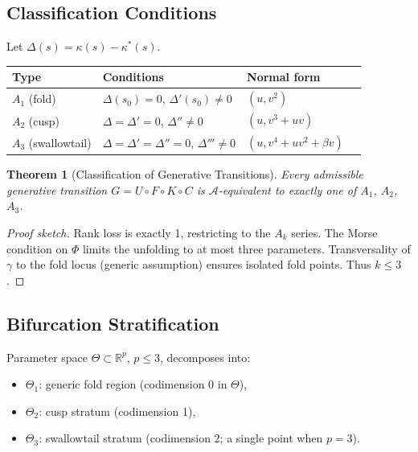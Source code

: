 \documentclass[12pt,a4paper]{article}
\newtheorem{theorem}{Theorem}[section]
\begin{document}
\subsection{Classification Conditions}

Let $\Delta(s) = \kappa(s) - \kappa^*(s)$.

\begin{center}
\small
\begin{tabular}{llll}
\toprule
Type & Conditions & Normal form \\
\midrule
$A_1$ (fold)        & $\Delta(s_0)=0$, $\Delta'(s_0)\neq 0$
                    & $(u, v^2)$ \\
$A_2$ (cusp)        & $\Delta=\Delta'=0$, $\Delta''\neq 0$
                    & $(u, v^3+uv)$ \\
$A_3$ (swallowtail) & $\Delta=\Delta'=\Delta''=0$, $\Delta'''\neq 0$
                    & $(u, v^4+uv^2+\beta v)$ \\
\bottomrule
\end{tabular}
\end{center}

\begin{theorem}[Classification of Generative Transitions]
\label{thm:classification}
Every admissible generative transition $G = U \circ F \circ K \circ C$
is $\mathcal{A}$-equivalent to exactly one of $A_1$, $A_2$, $A_3$.
\end{theorem}

\begin{proof}[Proof sketch]
Rank loss is exactly 1, restricting to the $A_k$ series.
The Morse condition on $\Phi$ limits the unfolding to at most three
parameters.
Transversality of $\gamma$ to the fold locus (generic assumption)
ensures isolated fold points.
Thus $k \leq 3$.
\end{proof}

\subsection{Bifurcation Stratification}

Parameter space $\Theta \subset \mathbb{R}^p$, $p \leq 3$,
decomposes into:
\begin{itemize}[leftmargin=2em]
  \item $\Theta_1$: generic fold region (codimension 0 in $\Theta$),
  \item $\Theta_2$: cusp stratum (codimension 1),
  \item $\Theta_3$: swallowtail stratum (codimension 2; a single point
    when $p = 3$).
\end{itemize}
\end{document}
